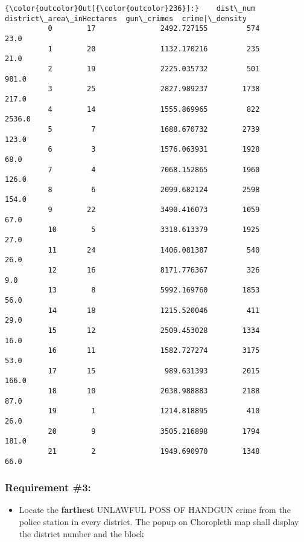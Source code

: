 \documentclass[11pt]{article}
\providecommand{\tightlist}{%
      \setlength{\itemsep}{0pt}\setlength{\parskip}{0pt}}
\begin{document}
\begin{Verbatim}[commandchars=\\\{\}]
{\color{outcolor}Out[{\color{outcolor}236}]:}    dist\_num  district\_area\_inHectares  gun\_crimes  crime|\_density
          0        17               2492.727155         574            23.0
          1        20               1132.170216         235            21.0
          2        19               2225.035732         501           981.0
          3        25               2827.989237        1738           217.0
          4        14               1555.869965         822          2536.0
          5         7               1688.670732        2739           123.0
          6         3               1576.063931        1928            68.0
          7         4               7068.152865        1960           126.0
          8         6               2099.682124        2598           154.0
          9        22               3490.416073        1059            67.0
          10        5               3318.613379        1925            27.0
          11       24               1406.081387         540            26.0
          12       16               8171.776367         326             9.0
          13        8               5992.169760        1853            56.0
          14       18               1215.520046         411            29.0
          15       12               2509.453028        1334            16.0
          16       11               1582.727274        3175            53.0
          17       15                989.631393        2015           166.0
          18       10               2038.988883        2188            87.0
          19        1               1214.818895         410            26.0
          20        9               3505.216898        1794           181.0
          21        2               1949.690970        1348            66.0
\end{Verbatim}
            
    \hypertarget{requirement-3}{%
\subsubsection{Requirement \#3:}\label{requirement-3}}

\begin{itemize}
\tightlist
\item
  Locate the \textbf{farthest} UNLAWFUL POSS OF HANDGUN crime from the
  police station in every district. The popup on Choropleth map shall
  display the district number and the block
\end{itemize}
\end{document}
